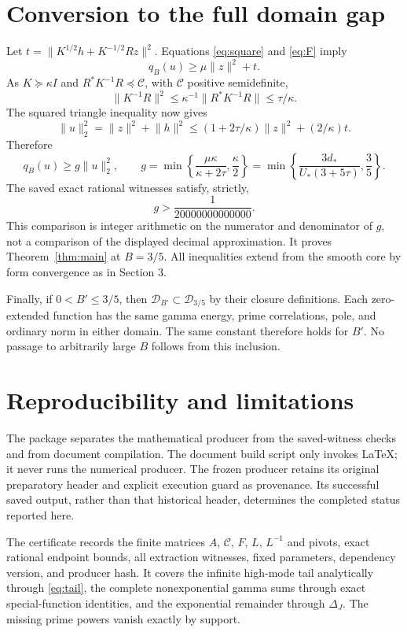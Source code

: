 \documentclass[11pt]{article}
\newcommand{\norm}[1]{\lVert#1\rVert}
\begin{document}
\section{Conversion to the full domain gap}
Let $t=\norm{K^{1/2}h+K^{-1/2}Rz}^2$. Equations \eqref{eq:square} and \eqref{eq:F} imply
\[
 q_B(u)\ge\mu\norm z^2+t.
\]
As $K\succeq\kappa I$ and $R^*K^{-1}R\preceq\mathcal C$, with $\mathcal C$ positive semidefinite,
\[
 \norm{K^{-1}R}^2\le\kappa^{-1}\norm{R^*K^{-1}R}\le\tau/\kappa.
\]
The squared triangle inequality now gives
\[
 \norm u_2^2=\norm z^2+\norm h^2
 \le(1+2\tau/\kappa)\norm z^2+(2/\kappa)t.
\]
Therefore
\begin{equation}
 q_B(u)\ge g\norm u_2^2,\qquad
 g=\min\left\{\frac{\mu\kappa}{\kappa+2\tau},\frac\kappa2\right\}
   =\min\left\{\frac{3d_*}{U_*(3+5\tau)},\frac35\right\}.\label{eq:g}
\end{equation}
The saved exact rational witnesses satisfy, strictly,
\[
 g>\frac1{20000000000000}.
\]
This comparison is integer arithmetic on the numerator and denominator of $g$, not a comparison of the displayed decimal approximation. It proves Theorem~\ref{thm:main} at $B=3/5$. All inequalities extend from the smooth core by form convergence as in Section 3.

Finally, if $0<B'\le3/5$, then $\mathcal D_{B'}\subset\mathcal D_{3/5}$ by their closure definitions. Each zero-extended function has the same gamma energy, prime correlations, pole, and ordinary norm in either domain. The same constant therefore holds for $B'$. No passage to arbitrarily large $B$ follows from this inclusion.

\section{Reproducibility and limitations}
The package separates the mathematical producer from the saved-witness checks and from document compilation. The document build script only invokes LaTeX; it never runs the numerical producer. The frozen producer retains its original preparatory header and explicit execution guard as provenance. Its successful saved output, rather than that historical header, determines the completed status reported here.

The certificate records the finite matrices $A$, $\mathcal C$, $F$, $L$, $L^{-1}$ and pivots, exact rational endpoint bounds, all extraction witnesses, fixed parameters, dependency version, and producer hash. It covers the infinite high-mode tail analytically through \eqref{eq:tail}, the complete nonexponential gamma sums through exact special-function identities, and the exponential remainder through $\Delta_J$. The missing prime powers vanish exactly by support.
\end{document}
